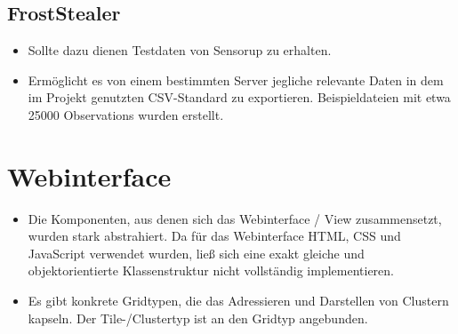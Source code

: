 \subsection{FrostStealer}
\begin{itemize}
	\item Sollte dazu dienen Testdaten von Sensorup zu erhalten.
	\item Ermöglicht es von einem bestimmten Server jegliche relevante Daten in dem im Projekt genutzten CSV-Standard zu exportieren. Beispieldateien mit etwa 25000 Observations wurden erstellt.
\end{itemize}

\section{Webinterface}
\begin{itemize}
	\item Die Komponenten, aus denen sich das Webinterface / View zusammensetzt, wurden stark abstrahiert. Da für das Webinterface HTML, CSS und JavaScript verwendet wurden, ließ sich eine exakt gleiche und objektorientierte Klassenstruktur nicht vollständig implementieren.
	\item Es gibt konkrete Gridtypen, die das Adressieren und Darstellen von Clustern kapseln. Der Tile-/Clustertyp ist an den Gridtyp angebunden.
\end{itemize}